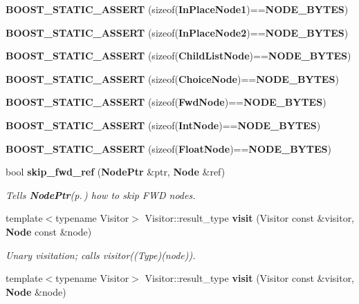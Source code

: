 \begin{CompactItemize}
\item 
{\bf BOOST\_\-STATIC\_\-ASSERT} (sizeof({\bf In\-Place\-Node1})=={\bf NODE\_\-BYTES})\label{namespacesprite_a59}

\item 
{\bf BOOST\_\-STATIC\_\-ASSERT} (sizeof({\bf In\-Place\-Node2})=={\bf NODE\_\-BYTES})\label{namespacesprite_a60}

\item 
{\bf BOOST\_\-STATIC\_\-ASSERT} (sizeof({\bf Child\-List\-Node})=={\bf NODE\_\-BYTES})\label{namespacesprite_a61}

\item 
{\bf BOOST\_\-STATIC\_\-ASSERT} (sizeof({\bf Choice\-Node})=={\bf NODE\_\-BYTES})\label{namespacesprite_a62}

\item 
{\bf BOOST\_\-STATIC\_\-ASSERT} (sizeof({\bf Fwd\-Node})=={\bf NODE\_\-BYTES})\label{namespacesprite_a63}

\item 
{\bf BOOST\_\-STATIC\_\-ASSERT} (sizeof({\bf Int\-Node})=={\bf NODE\_\-BYTES})\label{namespacesprite_a64}

\item 
{\bf BOOST\_\-STATIC\_\-ASSERT} (sizeof({\bf Float\-Node})=={\bf NODE\_\-BYTES})\label{namespacesprite_a65}

\item 
bool {\bf skip\_\-fwd\_\-ref} ({\bf Node\-Ptr} \&ptr, {\bf Node} \&ref)\label{namespacesprite_a66}

\begin{CompactList}\small\item\em Tells {\bf Node\-Ptr}{\rm (p.\,\pageref{structsprite_1_1NodePtr})} how to skip FWD nodes. \item\end{CompactList}\item 
template$<$typename Visitor$>$ Visitor::result\_\-type {\bf visit} (Visitor const \&visitor, {\bf Node} const \&node)
\begin{CompactList}\small\item\em Unary visitation; calls visitor((Type)(node)). \item\end{CompactList}\item 
template$<$typename Visitor$>$ Visitor::result\_\-type {\bf visit} (Visitor const \&visitor, {\bf Node} \&node)\label{namespacesprite_a68}


\end{CompactItemize}
